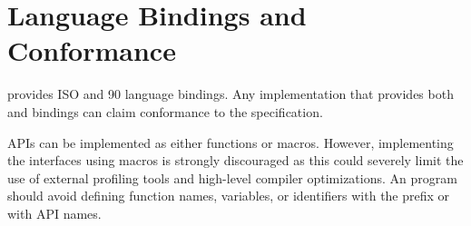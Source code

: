 \section{Language Bindings and Conformance}


\openshmem provides ISO \Clang{} and \Fortran{} 90 language
bindings. Any implementation that provides both \Clang{} and \Fortran{} bindings 
can claim conformance to the specification.

\openshmem{} \ac{API}s can be implemented as either 
functions or macros. However, implementing the interfaces using macros is
strongly discouraged as this could severely limit the use of external profiling tools 
and high-level compiler optimizations. An \openshmem{} program should avoid defining function names, variables, or
identifiers with the prefix \shmemprefix{} or with \openshmem \ac{API} names.


 
%


